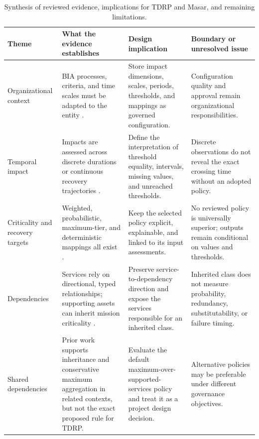 \begin{table}
\centering
\caption{Synthesis of reviewed evidence, implications for TDRP and Masar, and remaining limitations.}
\label{tab:lr_synthesis}
\footnotesize
\renewcommand{\arraystretch}{1.15}
\setlength{\tabcolsep}{5pt}
\begin{tabularx}{\linewidth}{>{\raggedright\arraybackslash}p{3.0cm} >{\raggedright\arraybackslash}X >{\raggedright\arraybackslash}X >{\raggedright\arraybackslash}X}
\toprule
\textbf{Theme} & \textbf{What the evidence establishes} & \textbf{Design implication} & \textbf{Boundary or unresolved issue} \\
\midrule
Organizational context & BIA processes, criteria, and time scales must be adapted to the entity \cite{iso22317catalogue,nrcnationalframework,dga2025guidelineen}. & Store impact dimensions, scales, periods, thresholds, and mappings as governed configuration. & Configuration quality and approval remain organizational responsibilities. \\
Temporal impact & Impacts are assessed across discrete durations or continuous recovery trajectories \cite{amm2023bia,sahebjamnia2015integrated,servicenow2025rto}. & Define the interpretation of threshold equality, intervals, missing values, and unreached thresholds. & Discrete observations do not reveal the exact crossing time without an adopted policy. \\
Criticality and recovery targets & Weighted, probabilistic, maximum-tier, and deterministic mappings all exist \cite{assetcriticality2023,dga2025guidelineen,globalsuite2025prebia}. & Keep the selected policy explicit, explainable, and linked to its input assessments. & No reviewed policy is universally superior; outputs remain conditional on values and thresholds. \\
Dependencies & Services rely on directional, typed relationships; supporting assets can inherit mission criticality \cite{rinaldi2001interdependencies,nist2018criticality,quinn2025bia}. & Preserve service-to-dependency direction and expose the services responsible for an inherited class. & Inherited class does not measure probability, redundancy, substitutability, or failure timing. \\
Shared dependencies & Prior work supports inheritance and conservative maximum aggregation in related contexts, but not the exact proposed rule for TDRP. & Evaluate the default maximum-over-supported-services policy and treat it as a project design decision. & Alternative policies may be preferable under different governance objectives. \\

\end{tabularx}
\end{table}
